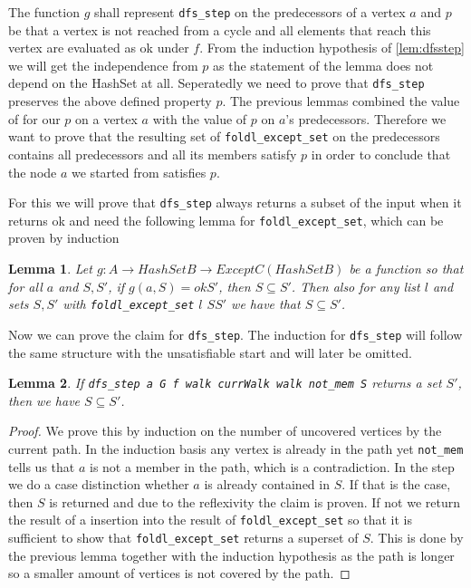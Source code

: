 \documentclass{article}
\newtheorem{lemma}{Lemma}
\begin{document}
        The function $g$ shall represent \texttt{dfs\_step} on the predecessors of a vertex $a$ and $p$ be that a vertex is not reached from a cycle and all elements that reach this vertex are evaluated as ok under $f$. From the induction hypothesis of \ref{lem:dfsstep} we will get the independence from $p$ as the statement of the lemma does not depend on the HashSet at all. Seperatedly we need to prove that \texttt{dfs\_step} preserves the above defined property $p$. The previous lemmas combined the value of for our $p$ on a vertex $a$ with the value of $p$ on $a$'s predecessors. Therefore we want to prove that the resulting set of \texttt{foldl\_except\_set} on the predecessors contains all predecessors and all its members satisfy $p$ in order to conclude that the node $a$ we started from satisfies $p$.

        For this we will prove that \texttt{dfs\_step} always returns a subset of the input when it returns ok and need the following lemma for \texttt{foldl\_except\_set}, which can be proven by induction
        \begin{lemma}
            Let $g: A \to HashSet B \to Except C (HashSet B)$ be a function so that for all $a$ and $S, S'$, if $g(a,S) = ok S'$, then $S \subseteq S'$. Then also for any list $l$ and sets $S, S'$ with \texttt{foldl\_except\_set} $l$ $S S'$ we have that $S \subseteq S'$.
        \end{lemma}

        Now we can prove the claim for \texttt{dfs\_step}. The induction for \texttt{dfs\_step} will follow the same structure with the unsatisfiable start and will later be omitted.

        \begin{lemma}
            If \texttt{dfs\_step a G f walk currWalk walk not\_mem S} returns a set $S'$, then we have $S \subseteq S'$.
        \end{lemma}
        \begin{proof}
            We prove this by induction on the number of uncovered vertices by the current path. In the induction basis any vertex is already in the path yet \texttt{not\_mem} tells us that $a$ is not a member in the path, which is a contradiction.
            In the step we do a case distinction whether $a$ is already contained in $S$. If that is the case, then $S$ is returned and due to the reflexivity the claim is proven.
            If not we return the result of a insertion into the result of \texttt{foldl\_except\_set} so that it is sufficient to show that \texttt{foldl\_except\_set} returns a superset of $S$. This is done by the previous lemma together with the induction hypothesis as the path is longer so a smaller amount of vertices is not covered by the path.
        \end{proof}
\end{document}
